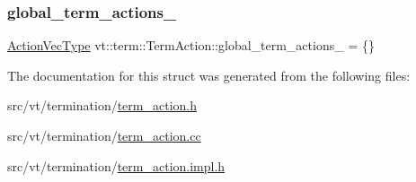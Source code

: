 \subsubsection{\texorpdfstring{global\+\_\+term\+\_\+actions\+\_\+}{global\_term\_actions\_}}
{\footnotesize\ttfamily \hyperlink{structvt_1_1term_1_1_term_action_a76d94f79a48ba8367b68f9188784da88}{Action\+Vec\+Type} vt\+::term\+::\+Term\+Action\+::global\+\_\+term\+\_\+actions\+\_\+ = \{\}\hspace{0.3cm}{\ttfamily [protected]}}



The documentation for this struct was generated from the following files\+:\begin{DoxyCompactItemize}
\item 
src/vt/termination/\hyperlink{term__action_8h}{term\+\_\+action.\+h}\item 
src/vt/termination/\hyperlink{term__action_8cc}{term\+\_\+action.\+cc}\item 
src/vt/termination/\hyperlink{term__action_8impl_8h}{term\+\_\+action.\+impl.\+h}\end{DoxyCompactItemize}
